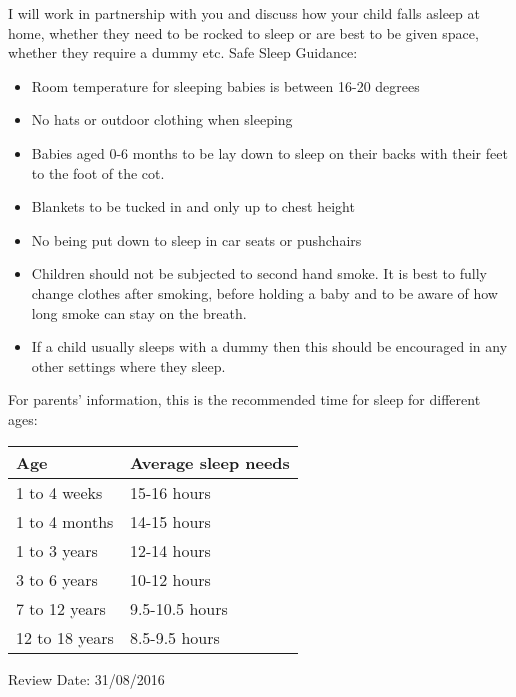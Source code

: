 I will work in partnership with you and discuss how your child falls asleep at home, whether they need to be rocked to sleep or are best to be given space, whether they require a dummy etc. 
Safe Sleep Guidance:

\begin{itemize}
\item Room temperature for sleeping babies is between 16-20 degrees
\item No hats or outdoor clothing when sleeping
\item Babies aged 0-6 months to be lay down to sleep on their backs with their feet to the foot of the cot.
\item Blankets to be tucked in and only up to chest height
\item No being put down to sleep in car seats or pushchairs
\item Children should not be subjected to second hand smoke. It is best to fully change clothes after smoking, before holding a baby and to be aware of how long smoke can stay on the breath. 
\item If a child usually sleeps with a dummy then this should be encouraged in any other settings where they sleep. 
\end{itemize}

For parents' information, this is the recommended time for sleep for different ages:

\begin{table}[h]
  \begin{tabular}{|l|l|}
    \hline
    Age & Average sleep needs \\
    \hline
    1 to 4 weeks     &   15-16 hours \\
    \hline       
    1 to 4 months &   14-15 hours \\
    \hline
    1 to 3 years &   12-14 hours \\
    \hline
    3 to 6 years &   10-12 hours \\
    \hline
    7 to 12 years &   9.5-10.5 hours \\
    \hline
    12 to 18 years &   8.5-9.5 hours \\
    \hline
  \end{tabular}
\end{table}

Review Date: 31/08/2016


